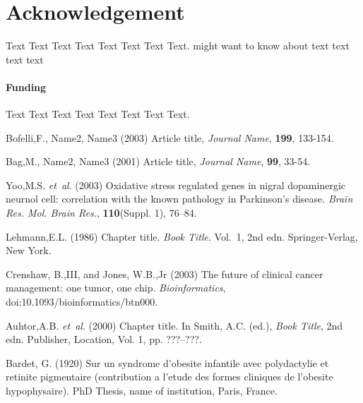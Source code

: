 \documentclass{bioinfo}
\begin{document}
%

%

%


\section*{Acknowledgement}
Text Text Text Text Text Text  Text Text.  \citealp{Boffelli03} might want to know about  text text text text

\paragraph{Funding\textcolon} Text Text Text Text Text Text  Text Text.

%
%
%
%
%
%
%
%
%


\begin{thebibliography}{}
 Bofelli,F., Name2, Name3 (2003) Article title, {\it Journal Name}, {\bf 199}, 133-154.

 Bag,M., Name2, Name3 (2001) Article title, {\it Journal Name}, {\bf 99}, 33-54.

Yoo,M.S. \textit{et~al}. (2003) Oxidative stress regulated genes
in nigral dopaminergic neurnol cell: correlation with the known
pathology in Parkinson's disease. \textit{Brain Res. Mol. Brain
Res.}, \textbf{110}(Suppl. 1), 76--84.

Lehmann,E.L. (1986) Chapter title. \textit{Book Title}. Vol.~1, 2nd edn. Springer-Verlag, New York.

Crenshaw, B.,III, and Jones, W.B.,Jr (2003) The future of clinical
cancer management: one tumor, one chip. \textit{Bioinformatics},
doi:10.1093/bioinformatics/btn000.

Auhtor,A.B. \textit{et~al}. (2000) Chapter title. In Smith, A.C.
(ed.), \textit{Book Title}, 2nd edn. Publisher, Location, Vol. 1, pp.
???--???.

Bardet, G. (1920) Sur un syndrome d'obesite infantile avec
polydactylie et retinite pigmentaire (contribution a l'etude des
formes cliniques de l'obesite hypophysaire). PhD Thesis, name of
institution, Paris, France.

\end{thebibliography}
\end{document}
